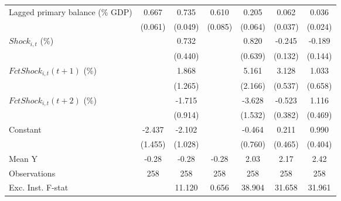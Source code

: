 {\begin{tabular}{l*{6}{c}}
\addlinespace
Lagged primary balance (\% GDP)&       0.667\sym{***}&       0.735\sym{***}&       0.610\sym{***}&       0.205\sym{***}&       0.062         &       0.036         \\
                    &     (0.061)         &     (0.049)         &     (0.085)         &     (0.064)         &     (0.037)         &     (0.024)         \\
\addlinespace
$ Shock_{i,t}$ (\%) &                     &       0.732         &                     &       0.820         &      -0.245\sym{*}  &      -0.189         \\
                    &                     &     (0.440)         &                     &     (0.639)         &     (0.132)         &     (0.144)         \\
\addlinespace
$ FctShock_{i,t}(t+1)$ (\%)&                     &       1.868         &                     &       5.161\sym{**} &       3.128\sym{***}&       1.033         \\
                    &                     &     (1.265)         &                     &     (2.166)         &     (0.537)         &     (0.658)         \\
\addlinespace
$ FctShock_{i,t}(t+2)$ (\%)&                     &      -1.715\sym{*}  &                     &      -3.628\sym{**} &      -0.523         &       1.116\sym{**} \\
                    &                     &     (0.914)         &                     &     (1.532)         &     (0.382)         &     (0.469)         \\
\addlinespace
Constant            &      -2.437         &      -2.102\sym{*}  &                     &      -0.464         &       0.211         &       0.990\sym{**} \\
                    &     (1.455)         &     (1.028)         &                     &     (0.760)         &     (0.465)         &     (0.404)         \\
\midrule
Mean Y              &       -0.28         &       -0.28         &       -0.28         &        2.03         &        2.17         &        2.42         \\
Observations        &         258         &         258         &         258         &         258         &         258         &         258         \\
Exc. Inst. F-stat   &                     &      11.120         &       0.656         &      38.904         &      31.658         &      31.961         \\
\bottomrule
\end{tabular}
}
